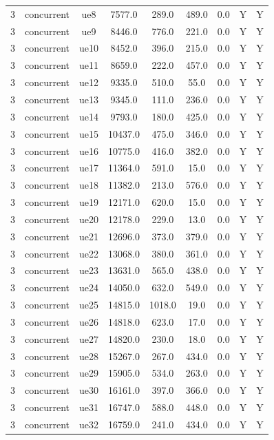\begin{table}[ht]
\begin{tabular}{|c|c|c|c|c|c|c|c|c|}
3 & concurrent & ue8 & 7577.0 & 289.0 & 489.0 & 0.0 & Y & Y \\
3 & concurrent & ue9 & 8446.0 & 776.0 & 221.0 & 0.0 & Y & Y \\
3 & concurrent & ue10 & 8452.0 & 396.0 & 215.0 & 0.0 & Y & Y \\
3 & concurrent & ue11 & 8659.0 & 222.0 & 457.0 & 0.0 & Y & Y \\
3 & concurrent & ue12 & 9335.0 & 510.0 & 55.0 & 0.0 & Y & Y \\
3 & concurrent & ue13 & 9345.0 & 111.0 & 236.0 & 0.0 & Y & Y \\
3 & concurrent & ue14 & 9793.0 & 180.0 & 425.0 & 0.0 & Y & Y \\
3 & concurrent & ue15 & 10437.0 & 475.0 & 346.0 & 0.0 & Y & Y \\
3 & concurrent & ue16 & 10775.0 & 416.0 & 382.0 & 0.0 & Y & Y \\
3 & concurrent & ue17 & 11364.0 & 591.0 & 15.0 & 0.0 & Y & Y \\
3 & concurrent & ue18 & 11382.0 & 213.0 & 576.0 & 0.0 & Y & Y \\
3 & concurrent & ue19 & 12171.0 & 620.0 & 15.0 & 0.0 & Y & Y \\
3 & concurrent & ue20 & 12178.0 & 229.0 & 13.0 & 0.0 & Y & Y \\
3 & concurrent & ue21 & 12696.0 & 373.0 & 379.0 & 0.0 & Y & Y \\
3 & concurrent & ue22 & 13068.0 & 380.0 & 361.0 & 0.0 & Y & Y \\
3 & concurrent & ue23 & 13631.0 & 565.0 & 438.0 & 0.0 & Y & Y \\
3 & concurrent & ue24 & 14050.0 & 632.0 & 549.0 & 0.0 & Y & Y \\
3 & concurrent & ue25 & 14815.0 & 1018.0 & 19.0 & 0.0 & Y & Y \\
3 & concurrent & ue26 & 14818.0 & 623.0 & 17.0 & 0.0 & Y & Y \\
3 & concurrent & ue27 & 14820.0 & 230.0 & 18.0 & 0.0 & Y & Y \\
3 & concurrent & ue28 & 15267.0 & 267.0 & 434.0 & 0.0 & Y & Y \\
3 & concurrent & ue29 & 15905.0 & 534.0 & 263.0 & 0.0 & Y & Y \\
3 & concurrent & ue30 & 16161.0 & 397.0 & 366.0 & 0.0 & Y & Y \\
3 & concurrent & ue31 & 16747.0 & 588.0 & 448.0 & 0.0 & Y & Y \\
3 & concurrent & ue32 & 16759.0 & 241.0 & 434.0 & 0.0 & Y & Y \\

\end{tabular}
\end{table}

